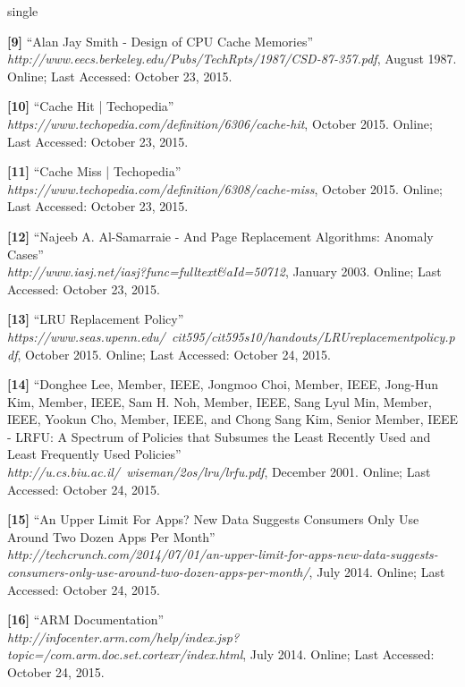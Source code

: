 \documentclass[12pt]{uthesis-v12}  %
\begin{document}
\begin{referencelist}{single}
	\item \textbf{[9]} ``Alan Jay Smith - Design of CPU Cache Memories''
	\\\emph{http://www.eecs.berkeley.edu/Pubs/TechRpts/1987/CSD-87-357.pdf}, August 1987. 
	Online; Last Accessed: October 23, 2015.
			
	\item \textbf{[10]} ``Cache Hit | Techopedia''
	\\\emph{https://www.techopedia.com/definition/6306/cache-hit}, October 2015. 
	Online; Last Accessed: October 23, 2015.
	
	\item \textbf{[11]} ``Cache Miss | Techopedia''
	\\\emph{https://www.techopedia.com/definition/6308/cache-miss}, October 2015. 
	Online; Last Accessed: October 23, 2015.	
									
	\item \textbf{[12]} ``Najeeb A. Al-Samarraie - And Page Replacement Algorithms: Anomaly Cases''
	\\\emph{http://www.iasj.net/iasj?func=fulltext\&aId=50712}, January 2003. 
	Online; Last Accessed: October 23, 2015.
										
	\item \textbf{[13]} ``LRU Replacement Policy''
	\\\emph{https://www.seas.upenn.edu/~cit595/cit595s10/handouts/LRUreplacementpolicy.pdf}, October 2015. 
	Online; Last Accessed: October 24, 2015.
	
	\item \textbf{[14]} ``Donghee Lee, Member, IEEE, Jongmoo Choi, Member, IEEE, Jong-Hun Kim, Member, IEEE,
	Sam H. Noh, Member, IEEE, Sang Lyul Min, Member, IEEE, Yookun Cho, Member, IEEE, and
	Chong Sang Kim, Senior Member, IEEE - LRFU: A Spectrum of Policies that
	Subsumes the Least Recently Used and
	Least Frequently Used Policies''
	\\\emph{http://u.cs.biu.ac.il/~wiseman/2os/lru/lrfu.pdf}, December 2001. 
	Online; Last Accessed: October 24, 2015.

	\item \textbf{[15]} ``An Upper Limit For Apps? New Data Suggests Consumers Only Use Around Two Dozen Apps Per Month''
	\\\emph{http://techcrunch.com/2014/07/01/an-upper-limit-for-apps-new-data-suggests-consumers-only-use-around-two-dozen-apps-per-month/}, July 2014. 
	Online; Last Accessed: October 24, 2015.
											
	\item \textbf{[16]} ``ARM Documentation''
	\\\emph{http://infocenter.arm.com/help/index.jsp?topic=/com.arm.doc.set.cortexr/index.html}, July 2014. 
	Online; Last Accessed: October 24, 2015.


\end{referencelist}
\end{document}
